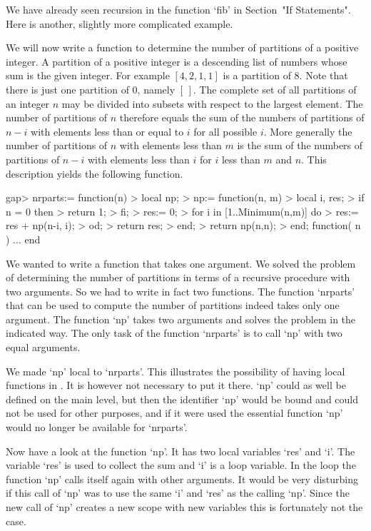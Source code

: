 
We have already seen recursion in the function `fib'
in Section~"If Statements".
Here is another, slightly more complicated example.

We will now write a function to determine  the number of partitions of
a positive integer.  A partition of a positive integer is a descending
list  of numbers   whose sum   is the   given   integer.  For  example
$[4,2,1,1]$ is a partition of 8. Note that there is just one partition
of 0, namely $[\,]$. The complete set of all  partitions of an integer
$n$ may be divided  into subsets with respect  to the largest element.
The number  of  partitions of   $n$ therefore  equals  the  sum of the
numbers of partitions of $n-i$ with elements less than or equal to $i$
for all possible $i$.  More generally the  number of partitions of $n$
with elements less than $m$ is the sum of the numbers of partitions of
$n-i$ with elements less than $i$ for $i$ less than $m$ and $n$.  This
description yields the following function.

\beginexample
gap> nrparts:= function(n)
>    local np;
>    np:= function(n, m)
>       local i, res;
>       if n = 0 then
>          return 1;
>       fi;
>       res:= 0;
>       for i in [1..Minimum(n,m)] do
>          res:= res + np(n-i, i);
>       od;
>       return res;
>    end;
>    return np(n,n);
> end;
function( n ) ... end
\endexample

We wanted to  write a function that  takes one argument.   We solved  the
problem of determining the number  of partitions in  terms of a recursive
procedure with two arguments.  So we had to write  in fact two functions.
The  function  `nrparts' that  can  be  used  to  compute the  number  of
partitions indeed takes only one  argument.  The  function `np' takes two
arguments and solves the problem in the indicated way.  The  only task of
the function `nrparts' is to call `np' with two equal arguments.

We made `np' local to `nrparts'.  This  illustrates the possibility of
having local functions in {\GAP}.  It is  however not necessary to put
it there.  `np' could as well  be defined on  the main level, but then
the  identifier `np' would  be bound and could   not be used for other
purposes, and if  it were used  the  essential function `np' would  no
longer be available for `nrparts'.

Now have a look at the function `np'. It has two local variables `res'
and `i'. The  variable `res' is  used to collect the sum  and `i' is a
loop  variable. In the loop the  function `np' calls itself again with
other arguments. It would be very disturbing if this call of `np' was
to use the same `i' and `res' as the calling `np'.  Since the new call
of `np' creates a new scope with new variables this is fortunately not
the case.

